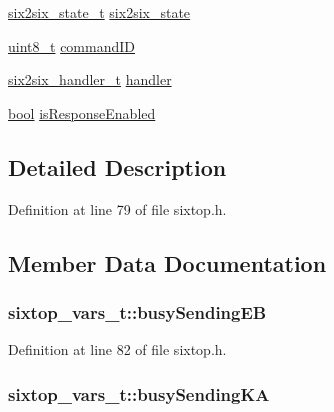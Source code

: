 \begin{DoxyCompactItemize}
\item 
\hyperlink{group__sixtop_ga0d114e8a582180b48d3b337cff5f90e0}{six2six\+\_\+state\+\_\+t} \hyperlink{structsixtop__vars__t_abe43b126130fc07ce040d70350561354}{six2six\+\_\+state}
\item 
\hyperlink{_p_e___types_8h_aba7bc1797add20fe3efdf37ced1182c5}{uint8\+\_\+t} \hyperlink{structsixtop__vars__t_a02f5ecfecd79bc15afe530302e4d0eb9}{command\+ID}
\item 
\hyperlink{group__sixtop_gaa3d42866c0888ad4ae5166773563addd}{six2six\+\_\+handler\+\_\+t} \hyperlink{structsixtop__vars__t_a5e7f298323cbe15db8bfd65f3fd3f08a}{handler}
\item 
\hyperlink{_p_e___types_8h_a97a80ca1602ebf2303258971a2c938e2}{bool} \hyperlink{structsixtop__vars__t_aa7e9cf5b5de02ae8d9e4611208a23307}{is\+Response\+Enabled}
\end{DoxyCompactItemize}


\subsection{Detailed Description}


Definition at line 79 of file sixtop.\+h.



\subsection{Member Data Documentation}
\subsubsection[{\texorpdfstring{busy\+Sending\+EB}{busySendingEB}}]{ sixtop\+\_\+vars\+\_\+t\+::busy\+Sending\+EB}\hypertarget{structsixtop__vars__t_a9c5af0aac4beea641117458a3fd21297}{}\label{structsixtop__vars__t_a9c5af0aac4beea641117458a3fd21297}


Definition at line 82 of file sixtop.\+h.

\subsubsection[{\texorpdfstring{busy\+Sending\+KA}{busySendingKA}}]{ sixtop\+\_\+vars\+\_\+t\+::busy\+Sending\+KA}\hypertarget{structsixtop__vars__t_a848f6f1946d0ab3969948b5e6a0f8c70}{}\label{structsixtop__vars__t_a848f6f1946d0ab3969948b5e6a0f8c70}


